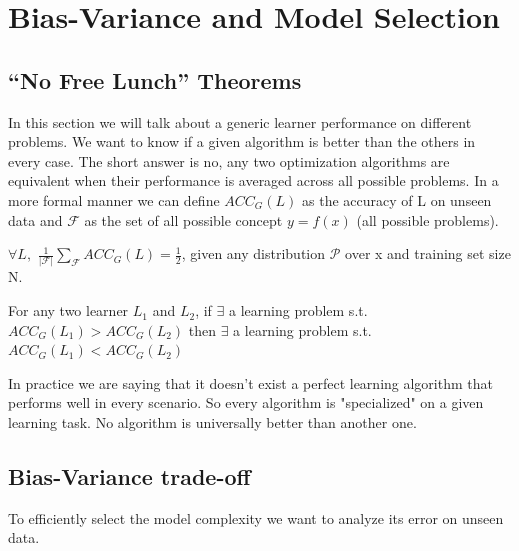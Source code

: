 \documentclass[../main.tex]{subfiles}
\begin{document}
\section{Bias-Variance and Model Selection}
\subsection{“No Free Lunch” Theorems}
In this section we will talk about a generic learner performance on different problems. We want to know if a given algorithm is better than the others in every case. The short answer is no, any two optimization algorithms are equivalent when their performance is averaged across all possible problems. In a more formal manner we can define $ACC_G(L)$ as the accuracy of L on unseen data and $\mathcal{F}$ as the set of all possible concept $y=f(x)$ (all possible problems).
\begin{theorem}
    $\forall L,$ $\frac{1}{|\mathcal{F}|} \sum_{\mathcal{F}} ACC_G(L) = \frac{1}{2}$, given any distribution $\mathcal{P}$ over x and training set size N.
\end{theorem}
\begin{corollary}
    For any two learner $L_1$ and $L_2$, if $\exists$ a learning problem s.t. $ACC_G(L_1)>ACC_G(L_2)$ then $\exists$ a learning problem s.t. $ACC_G(L_1)<ACC_G(L_2)$
\end{corollary}
In practice we are saying that it doesn't exist a perfect learning algorithm that performs well in every scenario. So every algorithm is "specialized" on a given learning task. No algorithm is universally better than another one.

\subsection{Bias-Variance trade-off}
To efficiently select the model complexity we want to analyze its error on unseen data.
\end{document}
